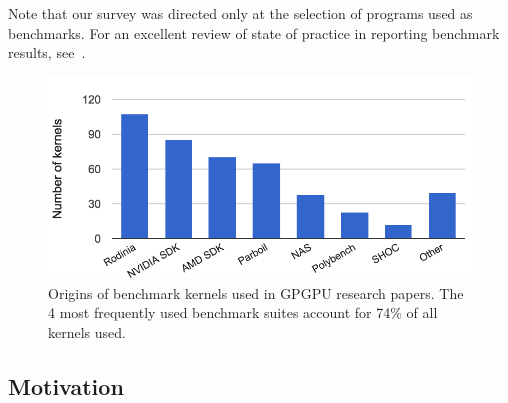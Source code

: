 \documentclass[preprint,nonatbib,10pt,nocopyrightspace]{sigplanconf}
\begin{document}
Note that our survey was directed only at the selection of programs
used as benchmarks. For an excellent review of state of practice in
reporting benchmark results, see~\cite{Belli2015}.


\begin{figure}%
  \includegraphics[width=\columnwidth]{img/benchmark-suite-distribution}
  \caption{%
    Origins of benchmark kernels used in GPGPU research papers. The 4
    most frequently used benchmark suites account for 74\% of all
    kernels used.%
  }
  \label{fig:benchmark-suite-distribution}
\end{figure}


\subsection{Motivation}\label{sec:motivation}
\end{document}

